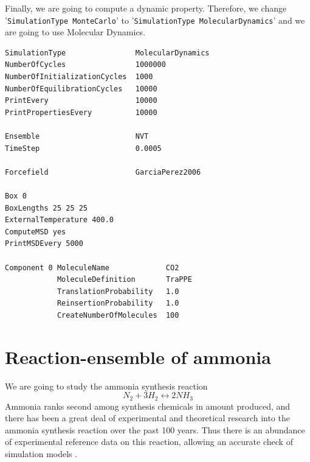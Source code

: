 Finally, we are going to compute a dynamic property. Therefore, we change '\verb+SimulationType MonteCarlo+' to
'\verb+SimulationType MolecularDynamics+' and we are going to use Molecular Dynamics.

\begin{verbatim}
SimulationType                MolecularDynamics
NumberOfCycles                1000000
NumberOfInitializationCycles  1000
NumberOfEquilibrationCycles   10000
PrintEvery                    10000
PrintPropertiesEvery          10000

Ensemble                      NVT
TimeStep                      0.0005

Forcefield                    GarciaPerez2006

Box 0
BoxLengths 25 25 25
ExternalTemperature 400.0
ComputeMSD yes
PrintMSDEvery 5000

Component 0 MoleculeName             CO2
            MoleculeDefinition       TraPPE
            TranslationProbability   1.0
            ReinsertionProbability   1.0
            CreateNumberOfMolecules  100

\end{verbatim}

\begin{center}
\end{center}

\section{Reaction-ensemble of ammonia}

We are going to study the ammonia synthesis reaction
\begin{equation}
  N_2 + 3H_2 \leftrightarrow 2NH_3
\end{equation}
Ammonia ranks second among synthesis chemicals in amount produced, and there has been a great deal of experimental and 
theoretical research into the ammonia synthesis reaction over the past 100 years. Thus there is an abundance
of experimental reference data on this reaction, allowing an accurate check of simulation models \cite{Turner2001}.

